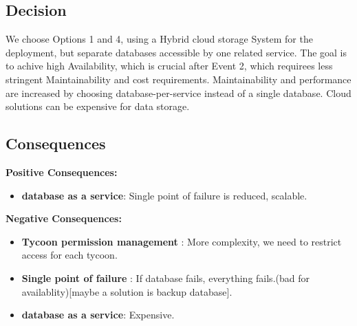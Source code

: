 \subsection*{Decision}
We choose Options 1 and 4, using a Hybrid cloud storage System for the deployment, but separate databases accessible by one related service.
The goal is to achive high Availability, which is crucial after Event 2, which requirees less stringent Maintainability and cost requirements. Maintainability and performance are increased by choosing database-per-service instead of a single database.
Cloud solutions can be expensive for data storage.

\subsection*{Consequences}
\textbf{Positive Consequences:}
\begin{itemize}
    \item \textbf{database as a service}: Single point of failure is reduced, scalable.
\end{itemize}
\textbf{Negative Consequences:}
\begin{itemize}
    \item \textbf{Tycoon permission management} : More complexity, we need to restrict access for each tycoon.
    \item \textbf{Single point of failure} : If database fails, everything fails.(bad for availablity)[maybe a solution is backup database].
    \item \textbf{database as a service}: Expensive.
\end{itemize}